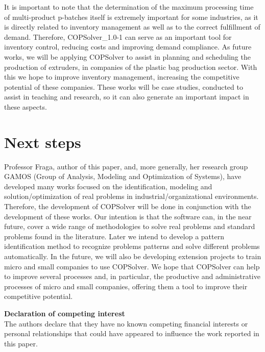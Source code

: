 \documentclass[11pt, letterpaper]{article}
\begin{document}
It is important to note that the determination of the maximum processing time of multi-product p-batches itself is extremely important for some industries, as it is directly related to inventory management as well as to the correct fulfillment of demand. Therefore, COPSolver\_1.0-1 can serve as an important tool for inventory control, reducing costs and improving demand compliance. As future works, we will be applying COPSolver to assist in planning and scheduling the production of extruders, in companies of the plastic bag production sector. With this we hope to improve inventory management, increasing the competitive potential of these companies. These works will be case studies, conducted to assist in teaching and research, so it can also generate an important impact in these aspects.


\section{Next steps}

Professor Fraga, author of this paper, and, more generally, her research group GAMOS (Group of Analysis, Modeling and Optimization of Systems), have developed many works focused on the identification, modeling and solution/optimization of real problems in industrial/organizational environments. Therefore, the development of COPSolver will be done in conjunction with the development of these works. Our intention is that the software can, in the near future, cover a wide range of methodologies to solve real problems and standard problems found in the literature. Later we intend to develop a pattern identification method to recognize problems patterns and solve different problems automatically. In the future, we will also be developing extension projects to train micro and small companies to use COPSolver. We hope that COPSolver can help to improve several processes and, in particular, the productive and administrative processes of micro and small companies, offering them a tool to improve their competitive potential.

\vskip0.3cm
\noindent
\textbf{Declaration of competing interest}\\
The authors declare that they have no known competing financial interests or personal relationships that could have appeared to influence the work reported in this paper.
\end{document}
